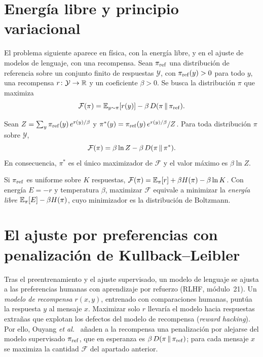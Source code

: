 \addtocounter{definicion}{1}%

\section{Energía libre y principio variacional}

El problema siguiente aparece en física, con la energía libre, y en el ajuste de modelos de lenguaje, con una recompensa. Sean $\pi_{\mathrm{ref}}$ una distribución de referencia sobre un conjunto finito de respuestas $\mathcal{Y}$, con $\pi_{\mathrm{ref}}(y)>0$ para todo $y$, una recompensa $r\colon\mathcal{Y}\to\mathbb{R}$ y un coeficiente $\beta>0$. Se busca la distribución $\pi$ que maximiza
\[
\mathcal{F}(\pi)=\mathbb{E}_{y\sim\pi}[r(y)]-\beta\,D(\pi\,\|\,\pi_{\mathrm{ref}}).
\]

\begin{teorema}\label{teo:variacional}
Sean $Z=\sum_y\pi_{\mathrm{ref}}(y)\,e^{r(y)/\beta}$ y $\pi^{*}(y)=\pi_{\mathrm{ref}}(y)\,e^{r(y)/\beta}/Z$. Para toda distribución $\pi$ sobre $\mathcal{Y}$,
\[
\mathcal{F}(\pi)=\beta\ln Z-\beta\,D(\pi\,\|\,\pi^{*}).
\]
En consecuencia, $\pi^{*}$ es el único maximizador de $\mathcal{F}$ y el valor máximo es $\beta\ln Z$.
\end{teorema}

\begin{corolario}\label{cor:energia-libre}
Si $\pi_{\mathrm{ref}}$ es uniforme sobre $K$ respuestas, $\mathcal{F}(\pi)=\mathbb{E}_\pi[r]+\beta H(\pi)-\beta\ln K$. Con energía $E=-r$ y temperatura $\beta$, maximizar $\mathcal{F}$ equivale a minimizar la \emph{energía libre} $\mathbb{E}_\pi[E]-\beta H(\pi)$, cuyo minimizador es la distribución de Boltzmann.
\end{corolario}

\section{El ajuste por preferencias con penalización de Kullback--Leibler}

Tras el preentrenamiento y el ajuste supervisado, un modelo de lenguaje se ajusta a las preferencias humanas con aprendizaje por refuerzo (RLHF, módulo~21). Un \emph{modelo de recompensa} $r(x,y)$, entrenado con comparaciones humanas, puntúa la respuesta $y$ al mensaje $x$. Maximizar solo $r$ llevaría el modelo hacia respuestas extrañas que explotan los defectos del modelo de recompensa (\emph{reward hacking}). Por ello, Ouyang \emph{et al.}~\cite{instructgpt} añaden a la recompensa una penalización por alejarse del modelo supervisado $\pi_{\mathrm{ref}}$, que en esperanza es $\beta\,D(\pi\,\|\,\pi_{\mathrm{ref}})$; para cada mensaje $x$ se maximiza la cantidad $\mathcal{F}$ del apartado anterior.

